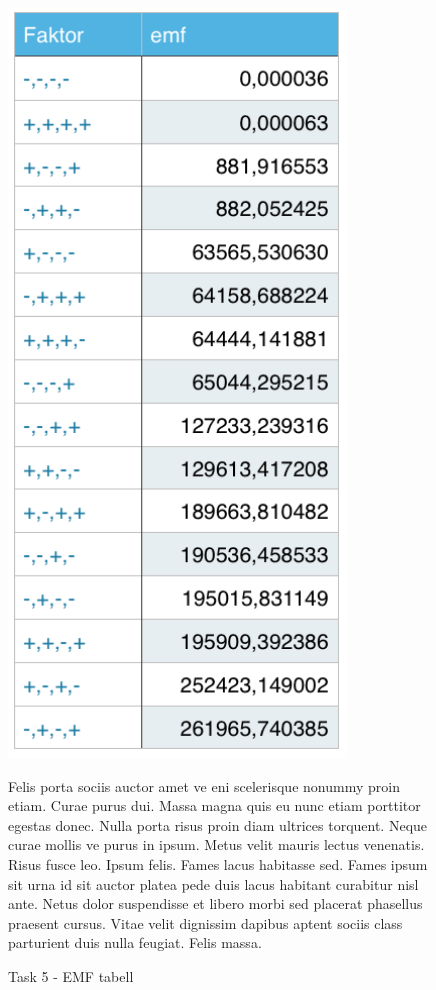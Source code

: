 	\begin{figure}[h]
		\begin{minipage}{.5\textwidth}
			\centering
			\includegraphics[width=0.8\textwidth]{sections/Exercise5/emf.png}
				\caption{Task 5 - EMF tabell}
				\label{fig:task5EMF}
		\end{minipage}
		\vspace{20 mm}
		\begin{minipage}{.5\textwidth}
			Felis porta sociis auctor amet ve eni scelerisque nonummy proin etiam. Curae purus dui. Massa magna quis eu nunc etiam porttitor egestas donec. Nulla porta risus proin diam ultrices torquent. Neque curae mollis ve purus in ipsum. Metus velit mauris lectus venenatis. Risus fusce leo. Ipsum felis. Fames lacus habitasse sed. Fames ipsum sit urna id sit auctor platea pede duis lacus habitant curabitur nisl ante. Netus dolor suspendisse et libero morbi sed placerat phasellus praesent cursus. Vitae velit dignissim dapibus aptent sociis class parturient duis nulla feugiat. Felis massa.
		\end{minipage}


\end{figure}

